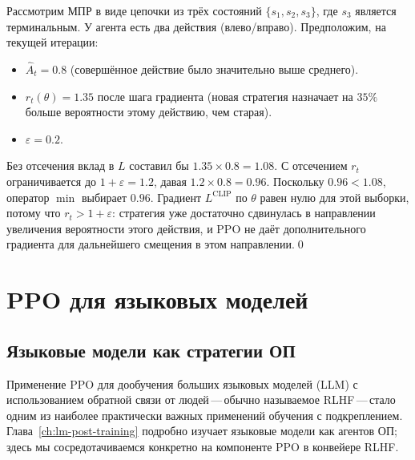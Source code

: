 \begin{example}
\label{ex:ppo-numeric}
Рассмотрим МПР в виде цепочки из трёх состояний $\{s_1, s_2, s_3\}$, где $s_3$ является терминальным. У агента есть два действия (влево/вправо). Предположим, на текущей итерации:
\begin{itemize}[leftmargin=*]
  \item $\hat{A}_t = 0.8$ (совершённое действие было значительно выше среднего).
  \item $r_t(\theta) = 1.35$ после шага градиента (новая стратегия назначает на $35\%$ больше вероятности этому действию, чем старая).
  \item $\varepsilon = 0.2$.
\end{itemize}
Без отсечения вклад в $L$ составил бы $1.35 \times 0.8 = 1.08$. С отсечением $r_t$ ограничивается до $1+\varepsilon = 1.2$, давая $1.2 \times 0.8 = 0.96$. Поскольку $0.96 < 1.08$, оператор $\min$ выбирает $0.96$. Градиент $L^{\mathrm{CLIP}}$ по $\theta$ равен нулю для этой выборки, потому что $r_t > 1+\varepsilon$: стратегия уже достаточно сдвинулась в направлении увеличения вероятности этого действия, и PPO не даёт дополнительного градиента для дальнейшего смещения в этом направлении.\qed
\end{example}

\section{PPO для языковых моделей}
\label{sec:ppo-llm}

\subsection{Языковые модели как стратегии ОП}

Применение PPO для дообучения больших языковых моделей (LLM) с использованием обратной связи от людей\,---\,обычно называемое RLHF\,---\,стало одним из наиболее практически важных применений обучения с подкреплением. Глава~\ref{ch:lm-post-training} подробно изучает языковые модели как агентов ОП; здесь мы сосредотачиваемся конкретно на компоненте PPO в конвейере RLHF.

